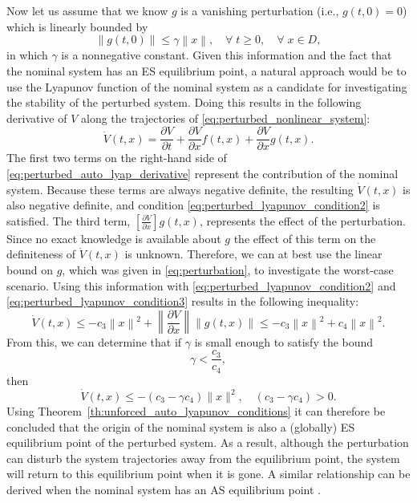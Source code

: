 Now let us assume that we know $g$ is a vanishing perturbation (i.e., $g \left( t, 0 \right)= 0$) which is linearly bounded by
\begin{equation} \label{eq:perturbation}
  \left\|g\left( t, 0 \right)\right\| \le \gamma \left\|x\right\|, \quad \forall \; t \ge 0, \quad \forall \; x \in D,
\end{equation}
in which $\gamma$ is a nonnegative constant. Given this information and the fact that the nominal system has an ES equilibrium point, a natural approach would be to use the Lyapunov function of the nominal system as a candidate for investigating the stability of the perturbed system. Doing this results in the following derivative of $V$ along the trajectories of \eqref{eq:perturbed_nonlinear_system}:
\begin{equation} \label{eq:perturbed_auto_lyap_derivative}
  \dot{ V }\left( t, x \right)=\frac{\partial V}{\partial t} + \frac{\partial V}{\partial x} f \left( t, x \right) + \frac{\partial V}{\partial x} g \left(t, x \right).
\end{equation}
The first two terms on the right-hand side of \eqref{eq:perturbed_auto_lyap_derivative} represent the contribution of the nominal system. Because these terms are always negative definite, the resulting $\dot{V}\left( t, x\right)$ is also negative definite, and condition \eqref{eq:perturbed_lyapunov_condition2} is satisfied. The third term, $\left[\frac{\partial V}{\partial x}\right] g \left(t, x \right)$, represents the effect of the perturbation. Since no exact knowledge is available about $g$ the effect of this term on the definiteness of $\dot{ V }\left( t, x \right)$ is unknown. Therefore, we can at best use the linear bound on $g$, which was given in \eqref{eq:perturbation}, to investigate the worst-case scenario. Using this information with \eqref{eq:perturbed_lyapunov_condition2} and \eqref{eq:perturbed_lyapunov_condition3} results in the following inequality:
\begin{equation}
  \dot{ V }\left( t, x \right) \le - c_3\left\|x\right\|^2 + \left\|\frac{\partial V}{\partial x}\right\|\left\|g\left(t, x\right)\right\| \le -c_3\left\|x\right\|^2+c_4\left\|x\right\|^2.
\end{equation}
From this, we can determine that if $\gamma$ is small enough to satisfy the bound
\begin{equation}
  \gamma<\frac{c_3}{c_4},
\end{equation}
then
\begin{equation}
  \dot{ V }\left( t, x \right) \le - \left( c_3 - \gamma c_4 \right) \|x\|^2, \quad \left(c_3 - \gamma c_4\right) > 0.
\end{equation}
Using Theorem~\ref{th:unforced_auto_lyapunov_conditions} it can therefore be concluded that the origin of the nominal system is also a (globally) ES equilibrium point of the perturbed system. As a result, although the perturbation can disturb the system trajectories away from the equilibrium point, the system will return to this equilibrium point when it is gone. A similar relationship can be derived when the nominal system has an AS equilibrium point \cite{khalilNonlinearControl2015}.

